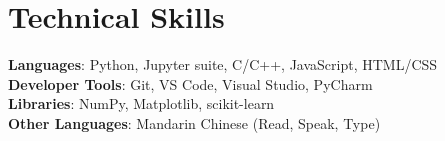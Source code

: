 \documentclass[letterpaper,11pt]{article}
\begin{document}
\section{Technical Skills}
 \begin{itemize}[leftmargin=0.15in, label={}]
    \small{\item{
     \textbf{Languages}{: Python, Jupyter suite, C/C++, JavaScript, HTML/CSS} \\
     \textbf{Developer Tools}{: Git, VS Code, Visual Studio, PyCharm} \\
     \textbf{Libraries}{: NumPy, Matplotlib, scikit-learn} \\
     \textbf{Other Languages}{: Mandarin Chinese (Read, Speak, Type)}
    }}
 \end{itemize}


\end{document}

